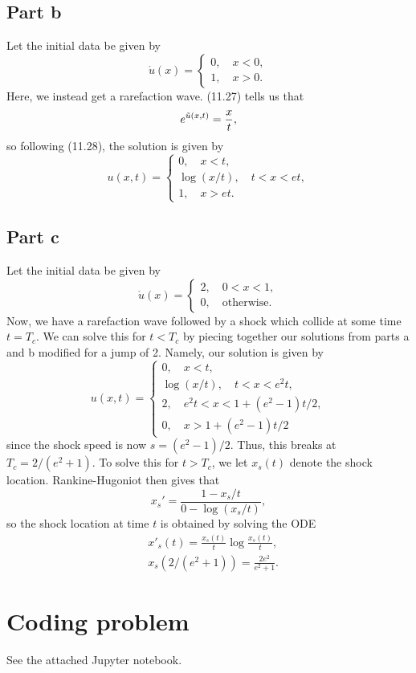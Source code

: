 \documentclass{article}
\begin{document}
\subsection{Part b}
Let the initial data be given by
\[
\mathring u(x)=\begin{cases}
	0,\quad x<0,\\
	1,\quad x>0.
\end{cases}
\]
Here, we instead get a rarefaction wave. (11.27) tells us that 
\[
e^{\Tilde u(x,t)}=\frac{x}{t},
\]
so following (11.28), the solution is given by
\[
u(x,t)=\begin{cases}
	0,\quad x<t,\\
	\log(x/t),\quad t<x<et,\\
	1,\quad x>et.
\end{cases}
\]
\subsection{Part c}
Let the initial data be given by
\[
\mathring{u}(x)=\begin{cases}
	2,\quad0<x<1,\\
	0,\quad\text{otherwise}.
\end{cases}
\]
Now, we have a rarefaction wave followed by a shock which collide at some time $t=T_c$. We can solve this for $t<T_c$ by piecing together our solutions from parts a and b modified for a jump of 2. Namely, our solution is given by
\[
u(x,t)=\begin{cases}
	0,\quad x<t,\\
	\log(x/t),\quad t<x<e^2t,\\
	2,\quad e^2t<x<1+(e^2-1)t/2,\\
	0,\quad x>1+(e^2-1)t/2
\end{cases}
\]
since the shock speed is now $s=(e^2-1)/2$. Thus, this breaks at $T_c=2/(e^2+1)$. To solve this for $t>T_c$, we let $x_s(t)$ denote the shock location. Rankine-Hugoniot then gives that 
\[
x_s'=\frac{1-x_s/t}{0-\log(x_s/t)},
\]
so the shock location at time $t$ is obtained by solving the ODE
\begin{align*}
&x'_s(t)=\frac{x_s(t)}{t}\log\frac{x_s(t)}{t},\\
&x_s(2/(e^2+1))=\frac{2e^2}{e^2+1}.
\end{align*}

\section{Coding problem}
See the attached Jupyter notebook.
\end{document}
